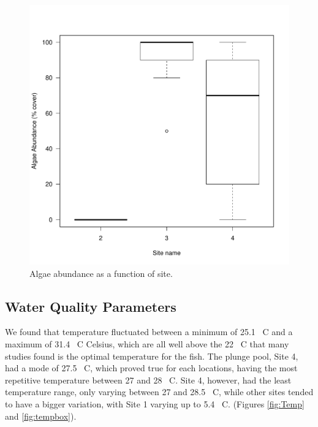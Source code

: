 \documentclass{article}\usepackage[]{graphicx}\usepackage[]{color}
\makeatletter
\def\maxwidth{ %
  \ifdim\Gin@nat@width>\linewidth
    \linewidth
  \else
    \Gin@nat@width
  \fi
}
\newenvironment{knitrout}{}{} %
\makeatother
\begin{document}
\begin{figure}[!ht]
\begin{knitrout}
\color{fgcolor}
\includegraphics[width=\maxwidth]{figure/unnamed-chunk-3-1} 

\end{knitrout}
\caption{Algae abundance as a function of site.}
\label{fig:algaesite}
\end{figure}

\subsection{Water Quality Parameters}

We found that temperature fluctuated between a minimum of 25.1 \textdegree~C and a maximum of 31.4 \textdegree~C Celsius, which are all well above the 22 \textdegree~C that many studies found is the optimal temperature for the fish. The plunge pool, Site 4, had a mode of 27.5 \textdegree~C, which proved true for each locations, having the most repetitive temperature between 27 and 28 \textdegree~C. Site 4, however, had the least temperature range, only varying between 27 and 28.5 \textdegree~C, while other sites tended to have a bigger variation, with Site 1 varying up to 5.4 \textdegree~C. (Figures \ref{fig:Temp} and \ref{fig:tempbox}).
\end{document}
